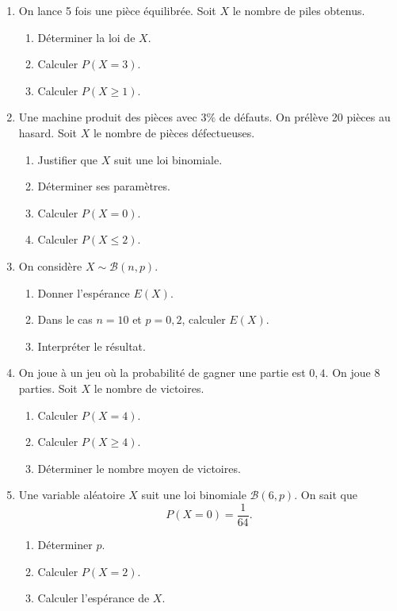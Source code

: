 \documentclass[11pt,a4paper]{article}
\begin{document}
\begin{enumerate}[label=\textbf{Exercice \arabic*.}, leftmargin=*, itemsep=1em]

\item On lance 5 fois une pièce équilibrée.  
Soit \(X\) le nombre de piles obtenus.

\begin{enumerate}[label=\alph*)]
    \item Déterminer la loi de \(X\).
    \item Calculer \(P(X=3)\).
    \item Calculer \(P(X\geq 1)\).
\end{enumerate}

\item Une machine produit des pièces avec \(3\%\) de défauts.  
On prélève 20 pièces au hasard. Soit \(X\) le nombre de pièces défectueuses.

\begin{enumerate}[label=\alph*)]
    \item Justifier que \(X\) suit une loi binomiale.
    \item Déterminer ses paramètres.
    \item Calculer \(P(X=0)\).
    \item Calculer \(P(X\leq 2)\).
\end{enumerate}

\item On considère \(X\sim\mathcal{B}(n,p)\).

\begin{enumerate}[label=\alph*)]
    \item Donner l'espérance \(E(X)\).
    \item Dans le cas \(n=10\) et \(p=0{,}2\), calculer \(E(X)\).
    \item Interpréter le résultat.
\end{enumerate}

\item On joue à un jeu où la probabilité de gagner une partie est \(0{,}4\).  
On joue 8 parties. Soit \(X\) le nombre de victoires.

\begin{enumerate}[label=\alph*)]
    \item Calculer \(P(X=4)\).
    \item Calculer \(P(X\geq 4)\).
    \item Déterminer le nombre moyen de victoires.
\end{enumerate}

\item Une variable aléatoire \(X\) suit une loi binomiale \(\mathcal{B}(6,p)\).  
On sait que
\[
P(X=0)=\frac1{64}.
\]

\begin{enumerate}[label=\alph*)]
    \item Déterminer \(p\).
    \item Calculer \(P(X=2)\).
    \item Calculer l'espérance de \(X\).
\end{enumerate}

\end{enumerate}
\end{document}
